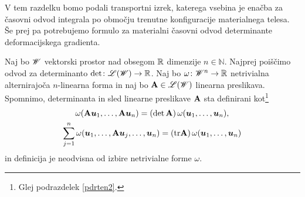 V tem razdelku bomo podali transportni izrek, katerega vsebina je
enačba za časovni odvod integrala po območju trenutne konfiguracije materialnega telesa.
Še prej pa potrebujemo formulo za materialni časovni odvod determinante deformacijskega gradienta.

Naj bo $\mathscr W$ vektorski prostor nad obsegom $\mathbb R$ dimenzije $n\in\mathbb{N}$.
Najprej poiščimo odvod za determinanto $\det\colon\mathscr L(\mathscr W)\to\mathbb R$.
Naj bo $\omega\colon \mathscr W^n\to\mathbb R$ netrivialna alternirajoča $n$-linearna forma
in naj bo $\mathbf A\in\mathscr L(\mathscr W)$ linearna preslikava.
Spomnimo, determinanta in sled linearne preslikave $\mathbf A$ sta definirani kot\footnote{
Glej podrazdelek \ref{pdrten2}.}
\begin{gather*}
	\omega(\mathbf A\boldsymbol u_1,\dots,\mathbf A\boldsymbol u_n)=(\det \mathbf A)\,\omega(\boldsymbol u_1,\dots,\boldsymbol u_n), \\
	\sum_{j=1}^n\omega(\boldsymbol u_1,\dots,\mathbf A\boldsymbol u_j,\dots,\boldsymbol u_n)=(\mathrm{tr} \mathbf A)\,\omega(\boldsymbol u_1,\dots,\boldsymbol u_n)
\end{gather*}
in definicija je neodvisna od izbire netrivialne forme $\omega$.

